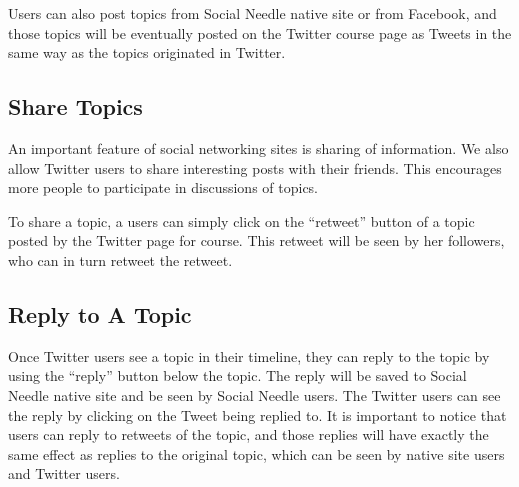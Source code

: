 Users can also post topics from Social Needle native site or from
Facebook, and those topics will be eventually posted on the Twitter
course page as Tweets in the same way as the topics originated in
Twitter.

\subsection{Share Topics}

An important feature of social networking sites is sharing of
information. We also allow Twitter users to share interesting posts
with their friends. This encourages more people to participate in
discussions of topics. 

To share a topic, a users can simply click on the ``retweet'' button of a
topic posted by the Twitter page for course. This retweet will be seen
by her followers, who can in turn retweet the retweet. 


\subsection{Reply to A Topic}

Once Twitter users see a topic in their timeline, they can reply to
the topic by using the ``reply'' button below the topic.  The reply
will be saved to Social Needle native site and be seen by Social
Needle users. The Twitter users can see the reply by clicking on the
Tweet being replied to. It is important to notice that users can reply
to retweets of the topic, and those replies will have exactly the same
effect as replies to the original topic, which can be seen by native
site users and Twitter users.
